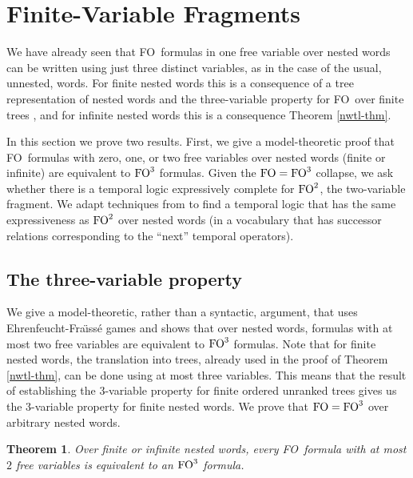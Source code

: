 \documentclass{LMCS}
\newcommand{\FO}{{\rm FO}}
\theoremstyle{plain}
\newtheorem{theorem}{Theorem}[section]
\theoremstyle{definition}
\begin{document}
\section{Finite-Variable Fragments}
\label{fv-sec}

\noindent We have already seen that \FO\ formulas in one free variable over
nested words can be written using just three distinct variables, as in
the case of the usual, unnested, words. For finite nested words this
is a consequence of a tree representation of nested words and the
three-variable property for \FO\ over finite trees \cite{marx-tods},
and for infinite nested words this is a consequence Theorem
\ref{nwtl-thm}. 

In this section we prove two results. First, we give a model-theoretic
proof that \FO\ formulas with zero, one, or two free variables over
nested words (finite or infinite) are equivalent to $\FO^3$ formulas.
Given the $\FO=\FO^3$ collapse, we ask whether there is
a temporal logic expressively complete for $\FO^2$, the two-variable
fragment. We adapt techniques from \cite{EVW02}
to find a temporal logic that has the same expressiveness as $\FO^2$
over nested words (in a vocabulary that has successor relations
corresponding to the ``next'' temporal operators).

\subsection{The three-variable property}

\newcommand{\sland}{\;\land\;}
\newcommand{\abs}[1]{ \vert #1 \vert }

We give a model-theoretic, rather than a syntactic,
argument, that uses 
Ehrenfeucht-Fra\"{\i}ss\'e games and shows that over nested words, 
formulas with at most two free variables are equivalent to
$\FO^3$ formulas. Note that for finite nested words, the translation
into trees, already used in the proof of Theorem \ref{nwtl-thm}, can
be done using at most three variables. This means that the result of
\cite{marx-tods} establishing the 3-variable property for finite
ordered unranked trees gives us the 3-variable property for finite
nested words. We prove that $\FO=\FO^3$ over arbitrary
nested words.

\begin{theorem}\label{3var th}
Over finite or infinite nested words, every \FO\ formula with at most
$2$ free variables is equivalent to an $\FO^3$ formula.
\end{theorem}
\end{document}
